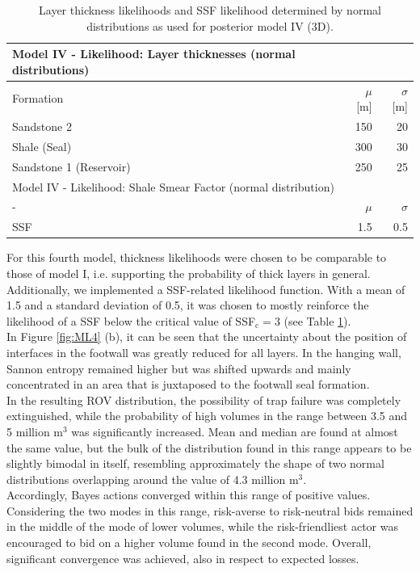 		\begin{table}[h]
			\centering
			\begin{tabular}{lrr} 
				\toprule
				Model IV - Likelihood: Layer thicknesses (normal distributions)\\  
				\midrule 
				Formation & $\mu$ [m] & $\sigma$ [m]\\ 
				\midrule 
				Sandstone 2 & 150 & 20 \\
				Shale (Seal) & 300 & 30\\ 
				Sandstone 1 (Reservoir) & 250 & 25 \\
				\bottomrule
				\toprule
				Model IV - Likelihood: Shale Smear Factor (normal distribution)\\
				\midrule
				- & $\mu$ & $\sigma$\\
				\midrule
				SSF & 1.5 & 0.5\\
				\bottomrule
			\end{tabular}
			\caption{Layer thickness likelihoods and SSF likelihood determined by normal distributions as used for posterior model IV (3D).}
			\label{tab:ML4_likelihoods}
		\end{table}
		For this fourth model, thickness likelihoods were chosen to be comparable to those of model I, i.e. supporting the probability of thick layers in general. Additionally, we implemented a SSF-related likelihood function. With a mean of 1.5 and a standard deviation of 0.5, it was chosen to mostly reinforce the likelihood of a SSF below the critical value of SSF$_\text{c} = 3$ (see Table \ref{tab:ML4_likelihoods}).\\
		In Figure \ref{fig:ML4} (b), it can be seen that the uncertainty about the position of interfaces in the footwall was greatly reduced for all layers. In the hanging wall, Sannon entropy remained higher but was shifted upwards and mainly concentrated in an area that is juxtaposed to the footwall seal formation.\\
		In the resulting ROV distribution, the possibility of trap failure was completely extinguished, while the probability of high volumes in the range between 3.5  and 5 million m$^3$ was significantly increased. Mean and median are found at almost the same value, but the bulk of the distribution found in this range appears to be slightly bimodal in itself, resembling approximately the shape of two normal distributions overlapping around the value of 4.3 million m$^3$.\\
		Accordingly, Bayes actions converged within this range of positive values. Considering the two modes in this range, risk-averse to risk-neutral bids remained in the middle of the mode of lower volumes, while the risk-friendliest actor was encouraged to bid on a higher volume found in the second mode. Overall, significant convergence was achieved, also in respect to expected losses.\\		
